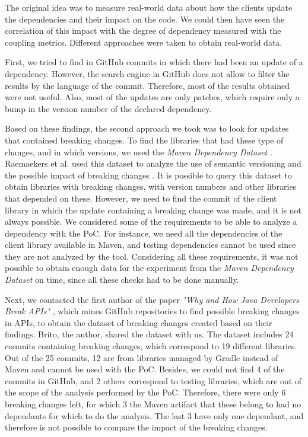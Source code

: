 
The original idea was to measure real-world data about how the clients update the dependencies and their impact on the code. We could then have seen the correlation of this impact with the degree of dependency measured with the coupling metrics. Different approaches were taken to obtain real-world data.

First, we tried to find in GitHub commits in which there had been an update of a dependency. However, the search engine in GitHub does not allow to filter the results by the language of the commit. Therefore, most of the results obtained were not useful. Also, most of the updates are only patches, which require only a bump in the version number of the declared dependency.

Based on these findings, the second approach we took was to look for updates that contained breaking changes. To find the libraries that had these type of changes, and in which versions, we used the \textit{Maven Dependency Dataset} \cite{Raemaekers2013}. Raemaekers et al. used this dataset to analyze the use of semantic versioning and the possible impact of breaking changes \cite{Raemaekers2017}. It is possible to query this dataset to obtain libraries with breaking changes, with version numbers and other libraries that depended on these. However, we need to find the commit of the client library in which the update containing a breaking change was made, and it is not always possible. We considered some of the requirements to be able to analyze a dependency with the PoC. For instance, we need all the dependencies of the client library available in Maven, and testing dependencies cannot be used since they are not analyzed by the tool. Considering all these requirements, it was not possible to obtain enough data for the experiment from the \textit{Maven Dependency Dataset} on time, since all these checks had to be done manually.

Next, we contacted the first author of the paper \textit{"Why and How Java Developers Break APIs"} \cite{Brito2018}, which mines GitHub repositories to find possible breaking changes in APIs, to obtain the dataset of breaking changes created based on their findings. Brito, the author, shared the dataset with us. The dataset includes 24 commits containing breaking changes, which correspond to 19 different libraries. Out of the 25 commits, 12 are from libraries managed by Gradle instead of Maven and cannot be used with the PoC. Besides, we could not find 4 of the commits in GitHub, and 2 others correspond to testing libraries, which are out of the scope of the analysis performed by the PoC. Therefore, there were only 6 breaking changes left, for which 3 the Maven artifact that these belong to had no dependants for which to do the analysis. The last 3 have only one dependant, and therefore is not possible to compare the impact of the breaking changes.

